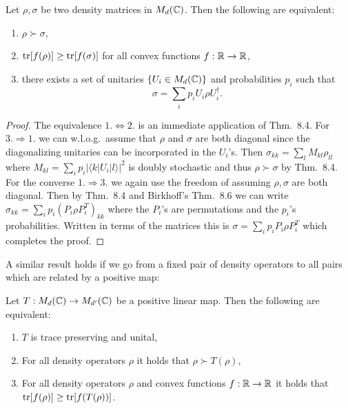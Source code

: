 \documentclass[11pt,a4paper]{article}
\theoremstyle{plain}
\theoremstyle{definition}
\theoremstyle{remark}
\begin{document}
\begin{theorem}
    Let $\rho,\sigma$ be two density matrices in $M_d(\mathbb{C})$. Then the following are equivalent:
    \begin{enumerate}
        \item $\rho \succ \sigma$,
        \item $\operatorname{tr}[f(\rho)]\ge \operatorname{tr}[f(\sigma)]$ for all convex functions $f:\mathbb{R}\to\mathbb{R}$,
        \item there exists a set of unitaries $\{U_i\in M_d(\mathbb{C})\}$ and probabilities $p_i$ such that
              \begin{equation}\tag{8.21}
                  \sigma = \sum_i p_i U_i \rho U_i^\dagger.
              \end{equation}
    \end{enumerate}
\end{theorem}

\begin{proof}
    The equivalence $1.\Leftrightarrow 2$. is an immediate application of Thm.~8.4. For $3.\Rightarrow 1$. we can w.l.o.g.\ assume that $\rho$
    and $\sigma$ are both diagonal since the diagonalizing unitaries can be incorporated in the $U_i$'s. Then
    $\sigma_{kk}=\sum_l M_{kl}\rho_{ll}$ where $M_{kl}=\sum_i p_i|\langle k|U_i|l\rangle|^2$ is doubly stochastic and thus $\rho\succ\sigma$
    by Thm.~8.4. For the converse $1.\Rightarrow 3$. we again use the freedom of assuming $\rho,\sigma$ are both diagonal. Then by Thm.~8.4 and
    Birkhoff's Thm.~8.6 we can write $\sigma_{kk}=\sum_i p_i (P_i\rho P_i^T)_{kk}$ where the $P_i$'s are permutations and the $p_i$'s probabilities.
    Written in terms of the matrices this is $\sigma=\sum_i p_i P_i\rho P_i^T$ which completes the proof.
\end{proof}

A similar result holds if we go from a fixed pair of density operators to all pairs which are related by a positive map:

\begin{theorem}
    Let $T:M_d(\mathbb{C})\to M_{d'}(\mathbb{C})$ be a positive linear map. Then the following are equivalent:
    \begin{enumerate}
        \item $T$ is trace preserving and unital,
        \item For all density operators $\rho$ it holds that $\rho \succ T(\rho)$,
        \item For all density operators $\rho$ and convex functions $f:\mathbb{R}\to\mathbb{R}$ it holds that $\operatorname{tr}[f(\rho)]\ge \operatorname{tr}[f(T(\rho))]$.
    \end{enumerate}
\end{theorem}
\end{document}
